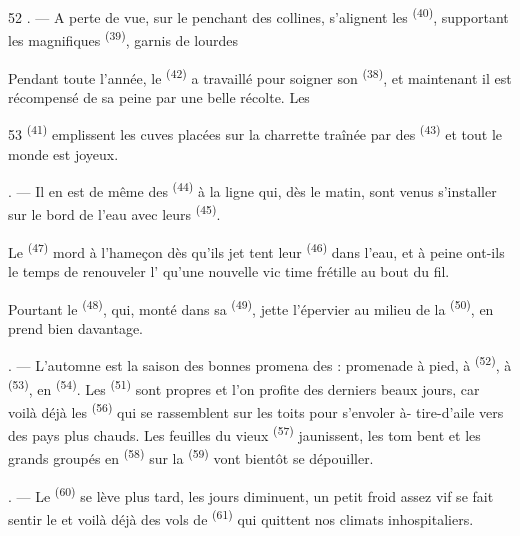 \begin{VUpage}[54]{52}
. --- A perte de vue, sur le penchant des collines,\nl
s'alignent les  \textsuperscript{(40)}, supportant les magnifiques\nl
{} \textsuperscript{(39)}, garnis de lourdes 

\VUblancAlinea
Pendant toute l'année, le  \textsuperscript{(42)} a travaillé\nl
pour soigner son  \textsuperscript{(38)}, et maintenant il est\nl
récompensé de sa peine par une belle récolte. Les
\parplein
\end{VUpage}

\begin{VUpage}[55]{53}
\VUcontinue
{} \textsuperscript{(41)} emplissent les cuves placées sur\nl
la charrette traînée par des  \textsuperscript{(43)} et tout le monde\nl
est joyeux.

. --- Il en est de même des  \textsuperscript{(44)} à la ligne\nl
qui, dès le matin, sont venus s'installer sur le bord de\nl
l'eau avec leurs  \textsuperscript{(45)}.

\VUblancAlinea
Le  \textsuperscript{(47)} mord à l'hameçon dès qu'ils jet\cc
tent leur  \textsuperscript{(46)} dans l'eau, et à peine ont-ils le\nl
temps de renouveler l' qu'une nouvelle vic\cc
time frétille au bout du fil.

\VUblancAlinea
Pourtant le  \textsuperscript{(48)}, qui, monté dans\nl
sa  \textsuperscript{(49)}, jette l'épervier au milieu de la\nl
{} \textsuperscript{(50)}, en prend bien davantage.

. --- L'automne est la saison des bonnes promena\cc
des : promenade à pied, à  \textsuperscript{(52)}, à  \textsuperscript{(53)},\nl
en  \textsuperscript{(54)}. Les  \textsuperscript{(51)} sont propres et l'on\nl
profite des derniers beaux jours, car voilà déjà les\nl
{} \textsuperscript{(56)} qui se rassemblent sur les toits pour\nl
s'envoler à- tire-d'aile vers des pays plus chauds. Les\nl
feuilles du vieux  \textsuperscript{(57)} jaunissent, les  tom\cc
bent et les grands  groupés en  \textsuperscript{(58)}\nl
sur la  \textsuperscript{(59)} vont bientôt se dépouiller.

. --- Le  \textsuperscript{(60)} se lève plus tard, les jours\nl
diminuent, un petit froid assez vif se fait sentir le\nl
{} et voilà déjà des vols de  \textsuperscript{(61)} qui\nl
quittent nos climats inhospitaliers.

\VUsaut{6.0mm}
\VUfilet{22mm}
\end{VUpage}

